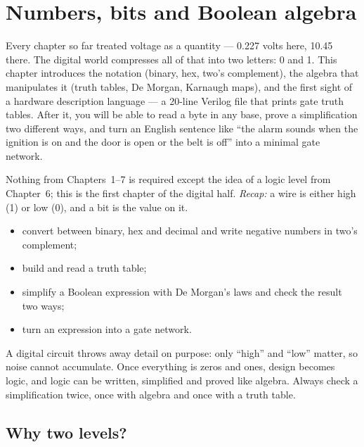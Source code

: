 \chapter{Numbers, bits and Boolean algebra}
\label{ch:digital}

Every chapter so far treated voltage as a quantity — 0.227 volts here,
10.45 there. The digital world compresses all of that into two letters:
0 and 1. This chapter introduces the notation (binary, hex, two's
complement), the algebra that manipulates it (truth tables, De Morgan,
Karnaugh maps), and the first sight of a hardware description language —
a 20-line Verilog file that prints gate truth tables. After it, you will
be able to read a byte in any base, prove a simplification two different
ways, and turn an English sentence like ``the alarm sounds when the
ignition is on and the door is open or the belt is off'' into a minimal
gate network.

\begin{rulebox}
Nothing from Chapters~1--7 is required except the idea of a logic level from Chapter~6; this is the first chapter of the digital half. \emph{Recap:} a wire is either high (1) or low (0), and a bit is the value on it.
\end{rulebox}
\begin{wins}
\begin{itemize}
\item convert between binary, hex and decimal and write negative numbers in two's complement;
\item build and read a truth table;
\item simplify a Boolean expression with De Morgan's laws and check the result two ways;
\item turn an expression into a gate network.
\end{itemize}
\end{wins}
\begin{principle}
A digital circuit throws away detail on purpose: only ``high'' and ``low'' matter, so noise cannot accumulate. Once everything is zeros and ones, design becomes logic, and logic can be written, simplified and proved like algebra. Always check a simplification twice, once with algebra and once with a truth table.
\end{principle}

\section{Why two levels?}
\label{sec:twolevels}

